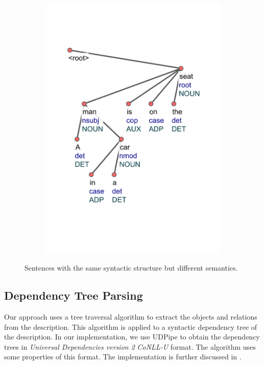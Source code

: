\begin{figure}[ht]
\begin{subfigure}{0.4\textwidth}
        \includegraphics[width=\textwidth,trim=20 120 20 100,clip]{figures/tree_2.pdf}
    \end{subfigure}
    \caption[Sentences with the same syntactic structure but different semantics]{Sentences with the same syntactic structure but different semantics.\protect{}}
    \label{fig:dependency_trees:1}
\end{figure}

\subsection{Dependency Tree Parsing}

Our approach uses a tree traversal algorithm to extract the objects and relations from the description. This algorithm is applied to a syntactic dependency tree of the description. In our implementation, we use UDPipe \citep{straka2018udpipe} to obtain the dependency trees in \emph{Universal Dependencies version 2} \citep{nivre2020universal} \emph{CoNLL-U} format. The algorithm uses some properties of this format. The implementation is further discussed in .

